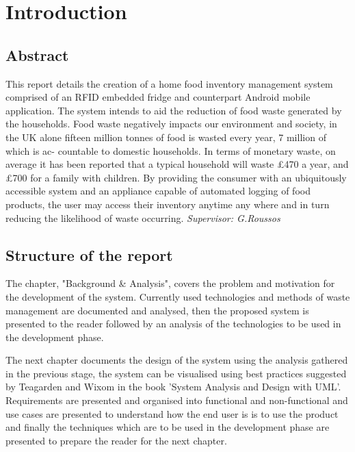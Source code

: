 \documentclass[a4paper, 11pt]{article}
\begin{document}
\clearpage




\pagestyle{fancy}
\renewcommand{\sectionmark}[1]{\markboth{#1}{}}
\fancyhf{} %
\renewcommand{\headrulewidth}{0pt}
\setlength{\footskip}{80pt}
\lhead{}
\chead{}
\cfoot{\fancyplain{}{\leftmark }} 

\setcounter{page}{1}
\section{Introduction}

\subsection{Abstract}
This report details the creation of a home food inventory management system comprised of an RFID embedded fridge and counterpart Android mobile application. The system intends to aid the reduction of food waste generated by the households. Food waste negatively impacts our environment and society, in the UK alone fifteen million tonnes of food is wasted every year, 7 million of which is ac- countable to domestic households.\cite{statistic} In terms of monetary waste, on average it has been reported that a typical household will waste \pounds{470} a year, and \pounds{700} for a family with children.\cite{WRAP} By providing the consumer with an ubiquitously accessible system and an appliance capable of automated logging of food products, the user may access their inventory anytime any where and in turn reducing the likelihood of waste occurring. 
\emph{Supervisor: G.Roussos}

\subsection{Structure of the report}
The chapter, "Background \& Analysis", covers the problem and motivation for the development of the system. Currently used technologies and methods of waste management are documented and analysed, then the proposed system is presented to the reader followed by an analysis of the technologies to be used in the development phase.

The next chapter documents the design of the system using the analysis gathered in the previous stage, the system can be visualised using best practices suggested by Teagarden and Wixom in the book 'System Analysis and Design with UML'. Requirements are presented and organised into functional and non-functional and use cases are presented to understand how the end user is is to use the product and finally the techniques which are to be used in the development phase are presented to prepare the reader for the next chapter. 
\end{document}
